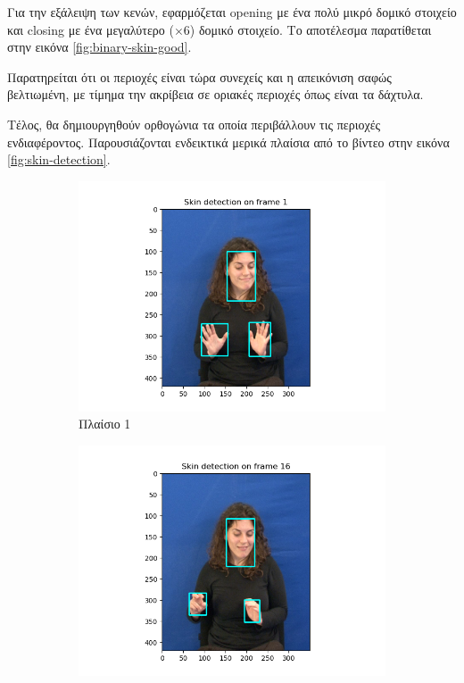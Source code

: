 \documentclass{article}
\newcommand{\eng}[1]{\foreignlanguage{english}{#1}}
\begin{document}
Για την εξάλειψη των κενών, εφαρμόζεται \eng{opening} με ένα πολύ μικρό δομικό στοιχείο και \eng{closing} με ένα μεγαλύτερο ($\times 6$) δομικό στοιχείο. Το αποτέλεσμα παρατίθεται στην εικόνα \ref{fig:binary-skin-good}.

Παρατηρείται ότι οι περιοχές είναι τώρα συνεχείς και η απεικόνιση σαφώς βελτιωμένη, με τίμημα την ακρίβεια σε οριακές περιοχές όπως είναι τα δάχτυλα. 

Τέλος, θα δημιουργηθούν ορθογώνια τα οποία περιβάλλουν τις περιοχές ενδιαφέροντος. Παρουσιάζονται ενδεικτικά μερικά πλαίσια από το βίντεο στην εικόνα \ref{fig:skin-detection}.

\begin{figure}
    \centering
    \begin{subfigure}[b]{0.49\textwidth}
        \centering
        \includegraphics[width=\textwidth]{../part1/results/skin_detection_1.png}
        \caption{Πλαίσιο 1}
        \label{fig:}
    \end{subfigure}
    \hfill
    \begin{subfigure}[b]{0.49\textwidth}  
        \centering 
        \includegraphics[width=\textwidth]{../part1/results/skin_detection_16.png}

\end{subfigure}
\end{figure}
\end{document}
